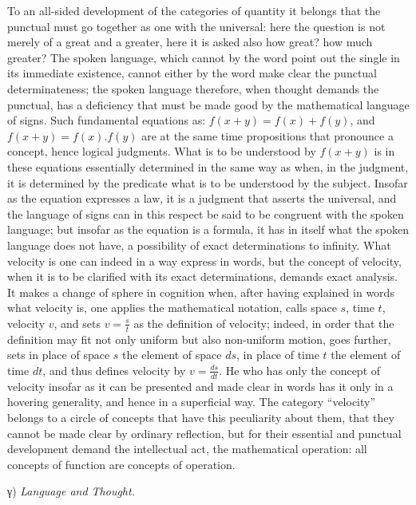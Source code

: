 \documentclass[12pt,a4paper,openany]{book}
\newcommand{\opage}[1]{\marginnote{\footnotesize\textit{[#1]}}}
\begin{document}
To an all-sided development of the categories of quantity
it belongs that the punctual must go together as one with the universal:
here the question is not merely of a great and a greater, here it is asked
also how great? how much greater? The spoken language, which
cannot by the word point out the single in its immediate
existence, cannot either by the word make clear the punctual
determinateness; the spoken language therefore, when thought
demands the punctual, has a deficiency that must be made good by
the mathematical language of signs. Such fundamental equations
as: $f(x + y) = f(x) + f(y)$, and $f(x + y) = f(x).f(y)$
are at the same time propositions that pronounce a concept, hence logical
judgments. What is to be understood by $f(x + y)$ is in
these equations essentially determined in the same way as
when, in the judgment, it is determined by the predicate what
is to be understood by the subject. Insofar as the equation expresses a
law, it is a judgment that asserts the universal, and the language of signs can in this respect be said to be congruent with the spoken language;
but insofar as the equation is a formula, it has
in itself what the spoken language does not have, a possibility of exact
determinations to infinity. What velocity is one can
indeed in a way express in words, but the concept of velocity,
when it is to be
\setcounter{footnote}{0}%
\opage{25}clarified with its exact determinations, demands exact analysis. It makes a change of sphere
in cognition when, after having explained in words what
velocity is, one applies the mathematical notation, calls space $s$, time $t$, velocity $v$, and sets $v=\frac{s}{t}$ as the definition of velocity; indeed, in order that the definition
may fit not only uniform but also
non-uniform motion, goes further, sets in place of space $s$ the element of space $ds$, in place of time $t$ the element of time $dt$, and
thus defines velocity by $v=\frac{ds}{dt}$. He who has only
the concept of velocity insofar as it can be presented and
made clear in words has it only in a hovering generality,
and hence in a superficial way. The category ``velocity''
belongs to a circle of concepts that have this peculiarity
about them, that they cannot be made clear by ordinary reflection,
but for their essential and punctual development demand the
intellectual act, the mathematical operation: all
concepts of function are concepts of operation.

\begin{center}γ) \emph{Language and Thought.}\end{center}
\end{document}
